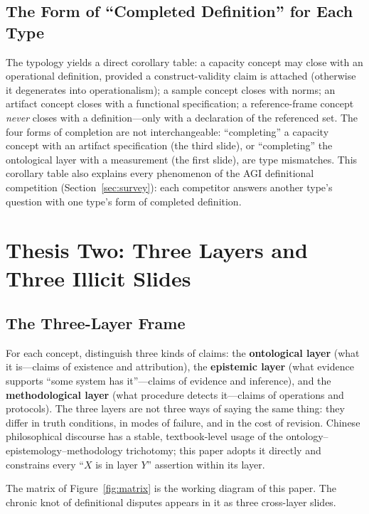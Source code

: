 \documentclass[10pt]{article}
\begin{document}
\subsection{The Form of ``Completed Definition'' for Each Type}

The typology yields a direct corollary table: a capacity concept may close with an operational definition, provided a construct-validity claim is attached (otherwise it degenerates into operationalism); a sample concept closes with norms; an artifact concept closes with a functional specification; a reference-frame concept \emph{never} closes with a definition---only with a declaration of the referenced set. The four forms of completion are not interchangeable: ``completing'' a capacity concept with an artifact specification (the third slide), or ``completing'' the ontological layer with a measurement (the first slide), are type mismatches. This corollary table also explains every phenomenon of the AGI definitional competition (Section~\ref{sec:survey}): each competitor answers another type's question with one type's form of completed definition.

\section{Thesis Two: Three Layers and Three Illicit Slides}\label{sec:layers}

\subsection{The Three-Layer Frame}

For each concept, distinguish three kinds of claims: the \textbf{ontological layer} (what it is---claims of existence and attribution), the \textbf{epistemic layer} (what evidence supports ``some system has it''---claims of evidence and inference), and the \textbf{methodological layer} (what procedure detects it---claims of operations and protocols). The three layers are not three ways of saying the same thing: they differ in truth conditions, in modes of failure, and in the cost of revision. Chinese philosophical discourse has a stable, textbook-level usage of the ontology--epistemology--methodology trichotomy; this paper adopts it directly and constrains every ``$X$ is in layer $Y$'' assertion within its layer.

The matrix of Figure~\ref{fig:matrix} is the working diagram of this paper. The chronic knot of definitional disputes appears in it as three cross-layer slides.
\end{document}
